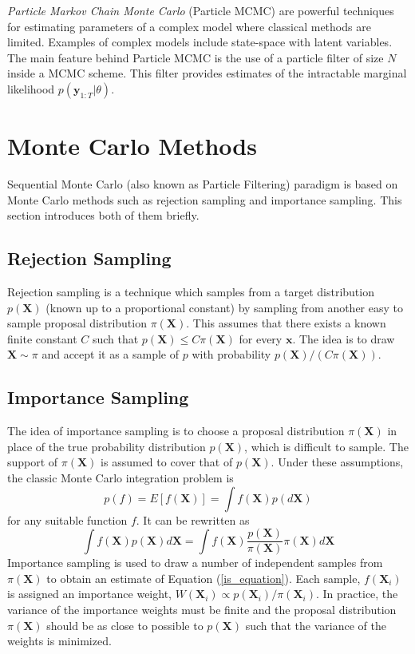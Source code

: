 \documentclass[11pt,a4,twosided,singlespacing,titlepagenumber=on]{scrreprt}
\numberwithin{equation}{chapter} %
\theoremstyle{remark}
\newcommand{\matr}[1]{\mathbf{#1}}
\begin{document}
\textit{Particle Markov Chain Monte Carlo} (Particle MCMC) are powerful techniques for estimating parameters of a complex model where classical methods are limited. Examples of complex models include state-space with latent variables. The main feature behind Particle MCMC is the use of a particle filter of size $N$ inside a MCMC scheme. This filter provides estimates of the intractable marginal likelihood $p(\matr{y}_{1:T}|\theta)$.

\section{Monte Carlo Methods}
\label{section:mc}
Sequential Monte Carlo (also known as Particle Filtering) paradigm is based on Monte Carlo methods such as rejection sampling and importance sampling. This section introduces both of them briefly.

\subsection{Rejection Sampling}
Rejection sampling is a technique which samples from a target distribution $p(\matr{X})$ (known up to a proportional constant) by sampling from another easy to sample proposal distribution $\pi(\matr{X})$. This assumes that there exists a known finite constant $C$ such that $p(\matr{X}) \leq C \pi(\matr{X})$ for every $\matr{x}$. The idea is to draw $\matr{X} \sim \pi$ and accept it as a sample of $p$ with probability $p(\matr{X}) / ( C \pi(\matr{X}))$.

\subsection{Importance Sampling}
The idea of importance sampling is to choose a proposal distribution $\pi(\matr{X})$ in place of the true probability distribution $p(\matr{X})$, which is difficult to sample. The support of $\pi(\matr{X})$ is assumed to cover that of $p(\matr{X})$. Under these assumptions, the classic Monte Carlo integration problem is
\begin{equation}
p(f) = E[f(\matr{X})] = \int f(\matr{X})p(d\matr{X})
\end{equation}
for any suitable function $f$. It can be rewritten as
\begin{equation}
\int f(\matr{X})p(\matr{X})d\matr{X} = \int f(\matr{X}) \frac{p(\matr{X})}{\pi(\matr{X})} \pi(\matr{X}) d\matr{X} \label{is_equation}
\end{equation}
Importance sampling is used to draw a number of independent samples from $\pi(\matr{X})$ to obtain an estimate of Equation (\ref{is_equation}). Each sample, $f(\matr{X}_i)$ is assigned an importance weight, $W(\matr{X}_i) \propto p(\matr{X}_i)/\pi(\matr{X}_i)$. In practice, the variance of the importance weights must be finite and the proposal distribution $\pi(\matr{X})$ should be as close to possible to $p(\matr{X})$ such that the variance of the weights is minimized. 
\end{document}

